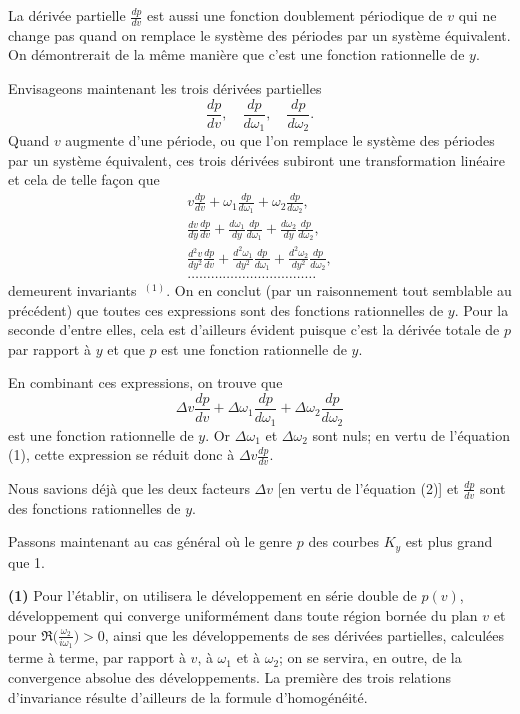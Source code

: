 \documentclass{article}
\begin{document}
La dérivée partielle $\frac{dp}{dv}$ est aussi une fonction doublement périodique de $v$ qui ne change pas quand on remplace le système des périodes par un système équivalent. On démontrerait de la même manière que c'est une fonction rationnelle de $y$.

Envisageons maintenant les trois dérivées partielles
\[
\frac{dp}{dv}, \quad \frac{dp}{d\omega_{1}}, \quad \frac{dp}{d\omega_{2}}.
\]
Quand $v$ augmente d'une période, ou que l'on remplace le système des périodes par un système équivalent, ces trois dérivées subiront une transformation linéaire et cela de telle façon que
\[
\begin{gathered}
v \frac{dp}{dv} + \omega_{1} \frac{dp}{d\omega_{1}} + \omega_{2} \frac{dp}{d\omega_{2}}, \\
\frac{dv}{dy} \frac{dp}{dv} + \frac{d\omega_{1}}{dy} \frac{dp}{d\omega_{1}} + \frac{d\omega_{2}}{dy} \frac{dp}{d\omega_{2}}, \\
\frac{d^{2}v}{dy^{2}} \frac{dp}{dv} + \frac{d^{2}\omega_{1}}{dy^{2}} \frac{dp}{d\omega_{1}} + \frac{d^{2}\omega_{2}}{dy^{2}} \frac{dp}{d\omega_{2}}, \\
\dots\dots\dots\dots\dots\dots\dots\dots\dots\dots\dots
\end{gathered} \tag{3}
\]
demeurent invariants~${}^{(1)}$. On en conclut (par un raisonnement tout semblable au précédent) que toutes ces expressions sont des fonctions rationnelles de $y$. Pour la seconde d'entre elles, cela est d'ailleurs évident puisque c'est la dérivée totale de $p$ par rapport à $y$ et que $p$ est une fonction rationnelle de $y$.

En combinant ces expressions, on trouve que
\[
\Delta v \frac{dp}{dv} + \Delta\omega_{1} \frac{dp}{d\omega_{1}} + \Delta\omega_{2} \frac{dp}{d\omega_{2}}
\]
est une fonction rationnelle de $y$. Or $\Delta\omega_{1}$ et $\Delta\omega_{2}$ sont nuls; en vertu de l'équation (1), cette expression se réduit donc à $\Delta v \frac{dp}{dv}$.

Nous savions déjà que les deux facteurs $\Delta v$ [en vertu de l'équation (2)] et $\frac{dp}{dv}$ sont des fonctions rationnelles de $y$.

Passons maintenant au cas général où le genre $p$ des courbes $K_{y}$ est plus grand que 1.

\textbf{(1)} Pour l'établir, on utilisera le développement en série double de $p(v)$, développement qui converge uniformément dans toute région bornée du plan $v$ et pour $\mathfrak{R}\bigl(\frac{\omega_{2}}{i\omega_{1}}\bigr) > 0$, ainsi que les développements de ses dérivées partielles, calculées terme à terme, par rapport à $v$, à $\omega_{1}$ et à $\omega_{2}$; on se servira, en outre, de la convergence absolue des développements. La première des trois relations d'invariance résulte d'ailleurs de la formule d'homogénéité.
\end{document}
